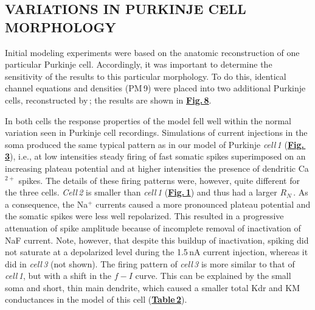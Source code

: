 \documentclass[12pt]{article}
\begin{document}
\subsection*{VARIATIONS IN PURKINJE CELL MORPHOLOGY}

Initial modeling experiments were based on the anatomic reconstruction of one particular Purkinje cell. Accordingly, it was important to determine the sensitivity of the results to this particular morphology. To do this, identical channel equations and densities (PM\,9) were placed into two additional Purkinje cells, reconstructed
by\,\cite{Rapp-P:1994qf}; the results are shown in \href{../pub-purkinje-deschutter1-fig-8/pub-purkinje-deschutter1-fig-8.tex}{\bf Fig.\,8}.

In both cells the response properties of the model fell well within the normal variation seen in Purkinje cell recordings. Simulations of current injections in the soma produced the same typical pattern as in our model of Purkinje {\it cell\,1} (\href{../pub-purkinje-deschutter1-fig-3/pub-purkinje-deschutter1-fig-3.tex}{\bf Fig.\,3}), i.e., at low intensities steady firing of fast somatic spikes superimposed on an increasing plateau potential and at higher intensities the presence of dendritic Ca$^{2+}$ spikes. The details of these firing patterns were, however, quite different for the three cells. {\it Cell\,2} is smaller than {\it cell\,1} (\href{../pub-purkinje-deschutter1-fig-1/pub-purkinje-deschutter1-fig-1.tex}{\bf Fig.\,1}) and thus had a larger $R_N$\,\cite{Rapp-P:1994qf}. As a consequence, the Na$^+$ currents caused a more pronounced plateau potential and the somatic spikes were less well repolarized. This resulted in a progressive attenuation of spike amplitude because of incomplete removal of inactivation of NaF current. Note, however, that despite this buildup of inactivation, spiking did not saturate at a depolarized level during the 1.5\,nA current injection, whereas it did in {\it cell\,3} (not shown). The firing pattern of {\it cell\,3} is more similar to that of {\it cell\,1}, but with a shift in the $f-I$ curve. This can be explained by the small soma and short, thin main dendrite, which caused a smaller total Kdr and KM conductances in the model of this cell (\href{../pub-purkinje-deschutter1-table2/pub-purkinje-deschutter1-table2.tex}{\bf Table\,2}).



\end{document}

